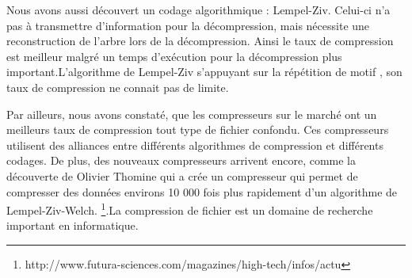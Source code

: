 \documentclass{report}
\begin{document}
Nous avons aussi découvert un codage algorithmique : Lempel-Ziv. Celui-ci n'a pas à transmettre d'information pour la décompression, mais nécessite une reconstruction de l'arbre lors de la décompression. Ainsi le taux de compression est meilleur malgré un temps d'exécution pour la décompression plus important.L'algorithme de Lempel-Ziv s'appuyant sur la répétition de motif , son taux de compression ne connait pas de limite.

Par ailleurs, nous avons constaté, que les compresseurs sur le marché ont un meilleurs taux de compression tout type de fichier confondu. Ces compresseurs utilisent des alliances entre différents algorithmes de compression et différents codages. De plus, des nouveaux compresseurs arrivent encore, comme la découverte de Olivier Thomine qui a crée un compresseur qui permet de compresser des données environs 10 000 fois plus rapidement d'un algorithme de Lempel-Ziv-Welch. \footnote{http://www.futura-sciences.com/magazines/high-tech/infos/actu}.La compression de fichier est un domaine de recherche important en informatique.
\end{document}
